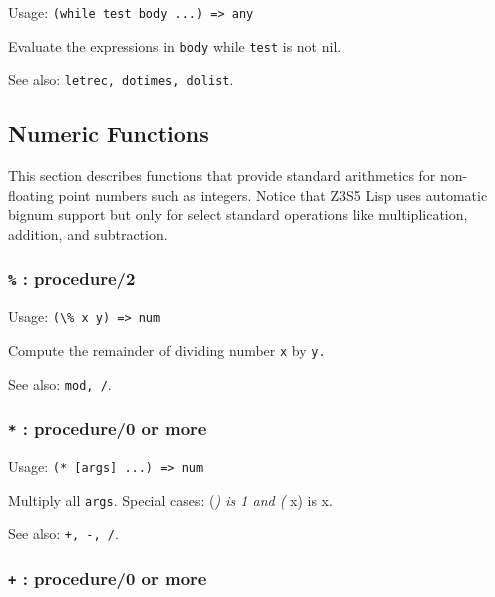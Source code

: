 \documentclass[
]{article}
\newcommand{\passthrough}[1]{#1}
\begin{document}
Usage: \passthrough{\lstinline!(while test body ...) => any!}

Evaluate the expressions in \passthrough{\lstinline!body!} while
\passthrough{\lstinline!test!} is not nil.

See also: \passthrough{\lstinline!letrec, dotimes, dolist!}.

\hypertarget{numeric-functions}{%
\subsection{Numeric Functions}\label{numeric-functions}}

This section describes functions that provide standard arithmetics for
non-floating point numbers such as integers. Notice that Z3S5 Lisp uses
automatic bignum support but only for select standard operations like
multiplication, addition, and subtraction.

\hypertarget{procedure2}{%
\subsubsection{\texorpdfstring{\texttt{\%} :
procedure/2}{\% : procedure/2}}\label{procedure2}}

Usage: \passthrough{\lstinline!(\% x y) => num!}

Compute the remainder of dividing number \passthrough{\lstinline!x!} by
\passthrough{\lstinline!y.!}

See also: \passthrough{\lstinline!mod, /!}.

\hypertarget{procedure0-or-more}{%
\subsubsection{\texorpdfstring{\texttt{*} : procedure/0 or
more}{* : procedure/0 or more}}\label{procedure0-or-more}}

Usage: \passthrough{\lstinline!(* [args] ...) => num!}

Multiply all \passthrough{\lstinline!args!}. Special cases: (\emph{) is
1 and (} x) is x.

See also: \passthrough{\lstinline!+, -, /!}.

\hypertarget{procedure0-or-more-1}{%
\subsubsection{\texorpdfstring{\texttt{+} : procedure/0 or
more}{+ : procedure/0 or more}}\label{procedure0-or-more-1}}
\end{document}
